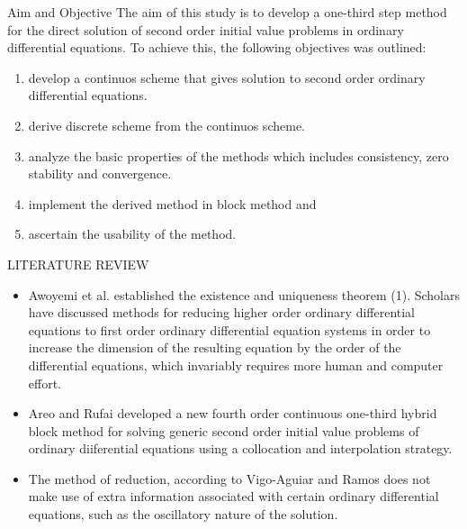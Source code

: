 \documentclass[compress, 19pt, blue]{beamer}
\begin{document}
\begin{frame}{Aim and Objective}
\noindent The aim of this study is to develop a one-third step method for the direct solution of second order initial value problems in ordinary differential equations. To achieve this, the following objectives was outlined:
\begin{enumerate}
	\item develop a continuos scheme that gives solution to second order ordinary differential equations.
	\item  derive discrete scheme from the continuos scheme.
	\item analyze the basic properties of the methods which includes consistency, zero stability and convergence.
	\item  implement the derived method in block method and
	\item  ascertain the usability of the method.
\end{enumerate}
\end{frame}
	
\begin{frame}{LITERATURE REVIEW}
	\color{blue}
\begin{itemize}
	\item Awoyemi et al.\cite{Awoyemi} established the existence and uniqueness theorem (1). Scholars have discussed methods for reducing higher order ordinary differential equations to first order ordinary differential equation systems in order to increase the dimension of the resulting equation by the order of the differential equations, which invariably requires more human and computer effort. 
	\item  Areo and Rufai \cite{Areo} developed a new fourth order continuous one-third hybrid block method for solving generic second order initial value problems of ordinary diiferential equations using a collocation and interpolation strategy.
	\item The method of reduction, according to Vigo-Aguiar and Ramos \cite{Vigo-Aguiar} does not make use of extra information associated with certain ordinary differential equations, such as the oscillatory nature of the solution.
\end{itemize}
\end{frame}
\end{document}

